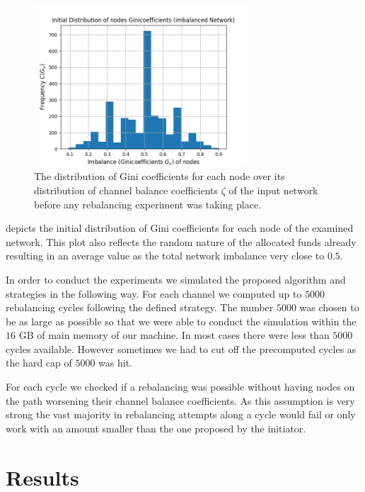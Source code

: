 \documentclass[conference]{IEEEtran}
\begin{document}
\begin{figure}
 \centering
 \includegraphics[width=8cm]{code/vs/fig/initial_ginis_before_rebalancing.png}
 \caption{The distribution of Gini coefficients for each node over its distribution of channel balance coefficients $\zeta$ of the input network before any rebalancing experiment was taking place.}
 \label{fig:initial_ginis}
\end{figure}

 depicts the initial distribution of Gini coefficients for each node of the examined network.
This plot also reflects the random nature of the allocated funds already resulting in an average value as the total network imbalance very close to $0.5$.

In order to conduct the experiments we simulated the proposed algorithm and strategies in the following way.
For each channel we computed up to $5000$ rebalancing cycles following the defined strategy.
The number $5000$ was chosen to be as large as possible so that we were able to conduct the simulation within the $16$ GB of main memory of our machine.
In most cases there were less than $5000$ cycles available.
However sometimes we had to cut off the precomputed cycles as the hard cap of $5000$ was hit.

For each cycle we checked if a rebalancing was possible without having nodes on the path worsening their channel balance coefficients.
As this assumption is very strong the vast majority in rebalancing attempts along a cycle would fail or only work with an amount smaller than the one proposed by the initiator. 
 

\section{Results}
\label{sec:results}
\end{document}
